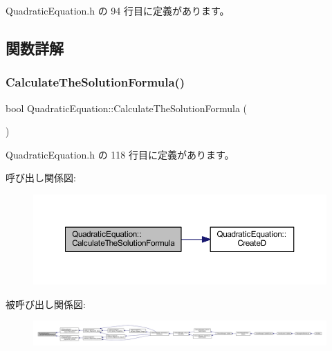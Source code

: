  Quadratic\+Equation.\+h の 94 行目に定義があります。



\subsection{関数詳解}
\mbox{\label{class_quadratic_equation_a624a3c6bb7b1cb741cba0b715075e2ed}} 
\subsubsection{\texorpdfstring{Calculate\+The\+Solution\+Formula()}{CalculateTheSolutionFormula()}}
{\footnotesize\ttfamily bool Quadratic\+Equation\+::\+Calculate\+The\+Solution\+Formula (\begin{DoxyParamCaption}{ }\end{DoxyParamCaption})\hspace{0.3cm}{\ttfamily [inline]}}



 Quadratic\+Equation.\+h の 118 行目に定義があります。

呼び出し関係図\+:\nopagebreak
\begin{figure}[H]
\begin{center}
\leavevmode
\includegraphics[width=350pt]{class_quadratic_equation_a624a3c6bb7b1cb741cba0b715075e2ed_cgraph}
\end{center}
\end{figure}
被呼び出し関係図\+:
\nopagebreak
\begin{figure}[H]
\begin{center}
\leavevmode
\includegraphics[width=350pt]{class_quadratic_equation_a624a3c6bb7b1cb741cba0b715075e2ed_icgraph}
\end{center}
\end{figure}
\mbox{\label{class_quadratic_equation_a52f73bed0b665bcf3ab827630b999762}} 
